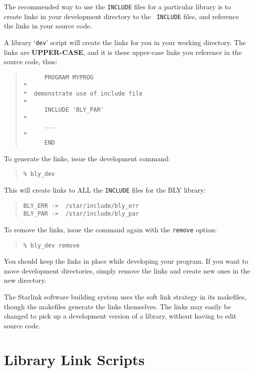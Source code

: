 \documentclass[twoside,11pt]{article}
\newcommand{\xlabel}[1]{}
\begin{document}
The recommended way to use the \texttt{INCLUDE} files for a particular
library is to create links in your development directory to the {\tt
INCLUDE} files, and reference the links in your source code.

A library `\texttt{dev}' script will create the links for you in your
working directory.  The links are \textbf{UPPER-CASE}, and it is these
upper-case links you reference in the source code, thus:

\begin{quote}
\begin{verbatim}
      PROGRAM MYPROG
*
*  demonstrate use of include file
*
      INCLUDE 'BLY_PAR'
*
      ...
*
      END
\end{verbatim}
\end{quote}

To generate the links, issue the development command:

\begin{quote}
\begin{verbatim}
% bly_dev
\end{verbatim}
\end{quote}

This will create links to ALL the \texttt{INCLUDE} files for the BLY library:

\begin{quote}
\begin{verbatim}
BLY_ERR ->  /star/include/bly_err
BLY_PAR ->  /star/include/bly_par
\end{verbatim}
\end{quote}

To remove the links, issue the command again with the \texttt{remove} option:

\begin{quote}
\begin{verbatim}
% bly_dev remove
\end{verbatim}
\end{quote}

You should keep the links in place while developing your program.  If you
want to move development directories, simply remove the links and create
new ones in the new directory.

The Starlink software building system uses the soft link strategy in its
makefiles, though the makefiles generate the links themselves.  The links
may easily be changed to pick up a development version of a library,
without having to edit source code.

\section{\xlabel{library_link_scripts}Library Link Scripts}
\label{library_link_scripts}
\end{document}
